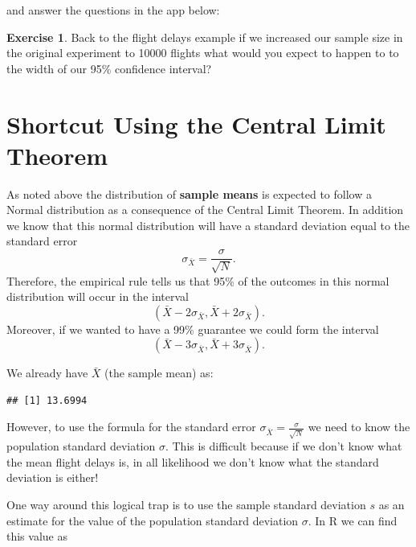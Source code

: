 \documentclass[
]{book}
\newenvironment{Shaded}{\begin{snugshade}}{\end{snugshade}}
\newcommand{\FunctionTok}[1]{\textcolor[rgb]{0.00,0.00,0.00}{#1}}
\newcommand{\NormalTok}[1]{#1}
\newcommand{\SpecialCharTok}[1]{\textcolor[rgb]{0.00,0.00,0.00}{#1}}
\theoremstyle{definition}
\theoremstyle{definition}
\theoremstyle{definition}
\newtheorem{exercise}{Exercise}[chapter]
\theoremstyle{definition}
\theoremstyle{remark}
\begin{document}
and answer the questions in the app below:

\begin{exercise}
\protect\hypertarget{exr:unnamed-chunk-376}{}\label{exr:unnamed-chunk-376}Back to the flight delays example if we increased our sample size in the original experiment to 10000 flights what would you expect to happen to to the width of our 95\% confidence interval?
\end{exercise}

\hypertarget{shortcut-using-the-central-limit-theorem}{%
\section{Shortcut Using the Central Limit Theorem}\label{shortcut-using-the-central-limit-theorem}}

As noted above the distribution of \textbf{sample means} is expected to follow a Normal distribution as a consequence of the Central Limit Theorem. In addition we know that this normal distribution will have a standard deviation equal to the standard error \[\sigma_{\bar{X}}=\frac{\sigma}{\sqrt{N}}.\] Therefore, the empirical rule tells us that 95\% of the outcomes in this normal distribution will occur in the interval \[(\bar{X}-2\sigma_{\bar{X}}, \bar{X}+2\sigma_{\bar{X}}).\] Moreover, if we wanted to have a 99\% guarantee we could form the interval \[(\bar{X}-3\sigma_{\bar{X}}, \bar{X}+3\sigma_{\bar{X}}).\]

We already have \(\bar{X}\) (the sample mean) as:

\begin{Shaded}
\end{Shaded}

\begin{verbatim}
## [1] 13.6994
\end{verbatim}

However, to use the formula for the standard error \(\sigma_{\bar{X}}=\frac{\sigma}{\sqrt{N}}\) we need to know the population standard deviation \(\sigma\). This is difficult because if we don't know what the mean flight delays is, in all likelihood we don't know what the standard deviation is either!

One way around this logical trap is to use the sample standard deviation \(s\) as an estimate for the value of the population standard deviation \(\sigma\). In R we can find this value as
\end{document}

